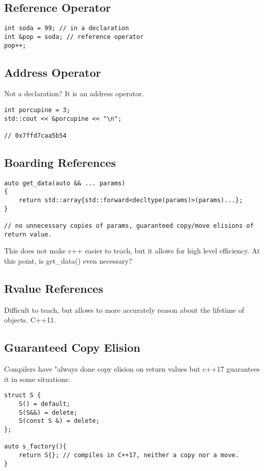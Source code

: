 \documentclass[openany]{report}
\begin{document}
\subsection{Reference Operator}

\begin{verbatim}
int soda = 99; // in a declaration
int &pop = soda; // reference operator
pop++;
\end{verbatim}

\subsection{Address Operator}

Not a declaration? It is an address operator.

\begin{verbatim}
int porcupine = 3; 
std::cout << &porcupine << "\n"; 

// 0x7ffd7caa5b54
\end{verbatim}

\subsection{Boarding References}

\begin{verbatim}
auto get_data(auto && ... params)
{
    return std::array{std::forward<decltype(params)>(params)...};
}

// no unnecessary copies of params, guaranteed copy/move elisions of return value.
\end{verbatim}

This does not make c++ easier to teach, but it allows for high level efficiency. At this point, 
is get\_data() even necessary?

\subsection{Rvalue References}

Difficult to teach, but allows to more accurately reason about the lifetime of objects. C++11.

\subsection{Guaranteed Copy Elision}

Compilers have "always done copy elision on return values but c++17 guarantees it in some situations:

\begin{verbatim}
struct S {
    S() = default;
    S(S&&) = delete;
    S(const S &) = delete;
};

auto s_factory(){
    return S{}; // compiles in C++17, neither a copy nor a move.
}
\end{verbatim}
\end{document}
